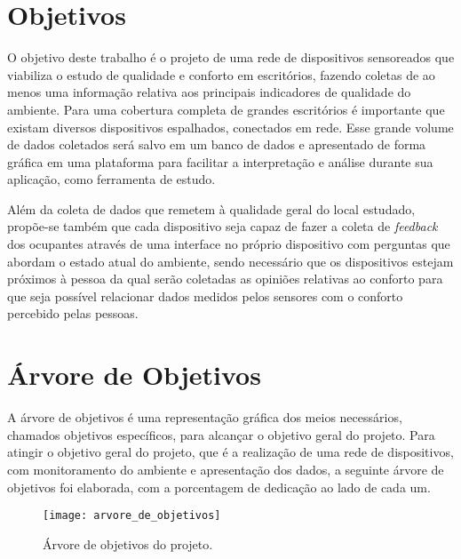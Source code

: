 \documentclass[../monografia.tex]{subfiles}
\begin{document}
\section{Objetivos}

O objetivo deste trabalho é o projeto de uma rede de dispositivos sensoreados que viabiliza o estudo de qualidade e conforto em escritórios, fazendo coletas de ao menos uma informação relativa aos principais indicadores de qualidade do ambiente. Para uma cobertura completa de grandes escritórios é importante que existam diversos dispositivos espalhados, conectados em rede. Esse grande volume de dados coletados será salvo em um banco de dados e apresentado de forma gráfica em uma plataforma para facilitar a interpretação e análise durante sua aplicação, como ferramenta de estudo. 

Além da coleta de dados que remetem à qualidade geral do local estudado, propõe-se também que cada dispositivo seja capaz de fazer a coleta de \textit{feedback} dos ocupantes através de uma interface no próprio dispositivo com perguntas que abordam o estado atual do ambiente, sendo necessário que os dispositivos estejam próximos à pessoa da qual serão coletadas as opiniões relativas ao conforto para que seja possível relacionar dados medidos pelos sensores com o conforto percebido pelas pessoas.


\section{Árvore de Objetivos} 
A árvore de objetivos é uma representação gráfica dos meios necessários, chamados objetivos específicos, para alcançar o objetivo geral do projeto. 
Para atingir o objetivo geral do projeto, que é a realização de uma rede de dispositivos, com monitoramento do ambiente e apresentação dos dados, a seguinte árvore de objetivos foi elaborada, com a porcentagem de dedicação ao lado de cada um.

\begin{figure}[h!]
\texttt{[image: arvore\_de\_objetivos]}
\centering
\caption{Árvore de objetivos do projeto.}
\label{fig:objective-tree}
\end{figure}
\end{document}
